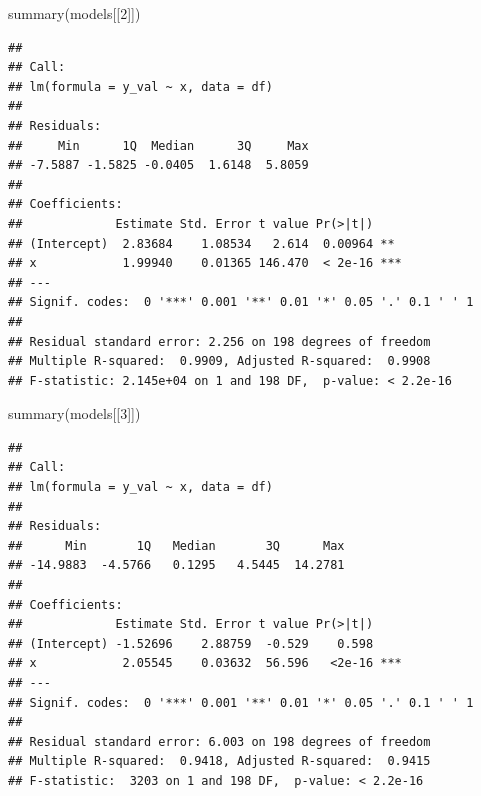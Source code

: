 \documentclass[
]{book}
\newenvironment{Shaded}{\begin{snugshade}}{\end{snugshade}}
\newcommand{\AttributeTok}[1]{\textcolor[rgb]{0.77,0.63,0.00}{#1}}
\newcommand{\ControlFlowTok}[1]{\textcolor[rgb]{0.13,0.29,0.53}{\textbf{#1}}}
\newcommand{\DecValTok}[1]{\textcolor[rgb]{0.00,0.00,0.81}{#1}}
\newcommand{\FunctionTok}[1]{\textcolor[rgb]{0.00,0.00,0.00}{#1}}
\newcommand{\NormalTok}[1]{#1}
\newcommand{\OtherTok}[1]{\textcolor[rgb]{0.56,0.35,0.01}{#1}}
\newcommand{\SpecialCharTok}[1]{\textcolor[rgb]{0.00,0.00,0.00}{#1}}
\begin{document}
\begin{Shaded}
\end{Shaded}

\begin{Shaded}
\begin{Highlighting}[]
\FunctionTok{summary}\NormalTok{(models[[}\DecValTok{2}\NormalTok{]])}
\end{Highlighting}
\end{Shaded}

\begin{verbatim}
## 
## Call:
## lm(formula = y_val ~ x, data = df)
## 
## Residuals:
##     Min      1Q  Median      3Q     Max 
## -7.5887 -1.5825 -0.0405  1.6148  5.8059 
## 
## Coefficients:
##             Estimate Std. Error t value Pr(>|t|)    
## (Intercept)  2.83684    1.08534   2.614  0.00964 ** 
## x            1.99940    0.01365 146.470  < 2e-16 ***
## ---
## Signif. codes:  0 '***' 0.001 '**' 0.01 '*' 0.05 '.' 0.1 ' ' 1
## 
## Residual standard error: 2.256 on 198 degrees of freedom
## Multiple R-squared:  0.9909, Adjusted R-squared:  0.9908 
## F-statistic: 2.145e+04 on 1 and 198 DF,  p-value: < 2.2e-16
\end{verbatim}

\begin{Shaded}
\begin{Highlighting}[]
\FunctionTok{summary}\NormalTok{(models[[}\DecValTok{3}\NormalTok{]])}
\end{Highlighting}
\end{Shaded}

\begin{verbatim}
## 
## Call:
## lm(formula = y_val ~ x, data = df)
## 
## Residuals:
##      Min       1Q   Median       3Q      Max 
## -14.9883  -4.5766   0.1295   4.5445  14.2781 
## 
## Coefficients:
##             Estimate Std. Error t value Pr(>|t|)    
## (Intercept) -1.52696    2.88759  -0.529    0.598    
## x            2.05545    0.03632  56.596   <2e-16 ***
## ---
## Signif. codes:  0 '***' 0.001 '**' 0.01 '*' 0.05 '.' 0.1 ' ' 1
## 
## Residual standard error: 6.003 on 198 degrees of freedom
## Multiple R-squared:  0.9418, Adjusted R-squared:  0.9415 
## F-statistic:  3203 on 1 and 198 DF,  p-value: < 2.2e-16
\end{verbatim}
\end{document}
